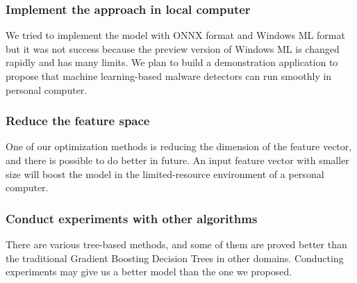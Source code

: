 \subsubsection{Implement the approach in local computer}

We tried to implement the model with ONNX format and Windows ML format but it was not success because the preview version of Windows ML is changed rapidly and has many limits. We plan to build a demonstration application to propose that machine learning-based malware detectors can run smoothly in personal computer.

\subsubsection{Reduce the feature space}

One of our optimization methods is reducing the dimension of the feature vector, and there is possible to do better in future. An input feature vector with smaller size will boost the model in the limited-resource environment of a personal computer. 

\subsubsection{Conduct experiments with other algorithms}


There are various tree-based methods, and some of them are proved better than the traditional Gradient Boosting Decision Trees in other domains. Conducting experiments may give us a better model than the one we proposed.


